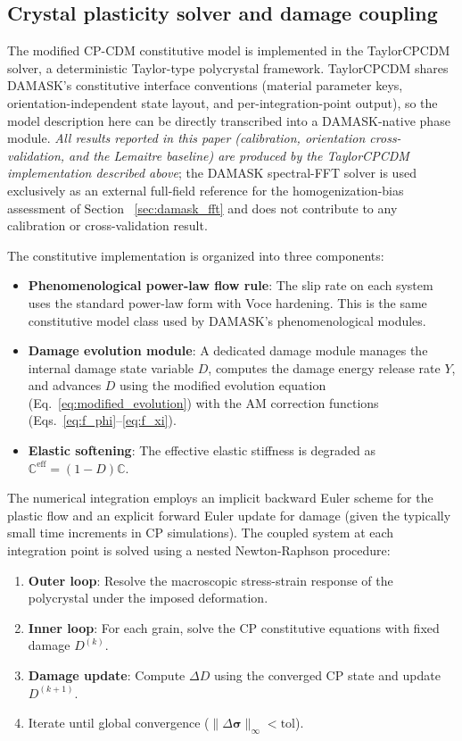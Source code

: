 \subsection{Crystal plasticity solver and damage coupling}

The modified CP-CDM constitutive model is implemented in the TaylorCPCDM solver, a deterministic Taylor-type polycrystal framework. TaylorCPCDM shares DAMASK's constitutive interface conventions (material parameter keys, orientation-independent state layout, and per-integration-point output), so the model description here can be directly transcribed into a DAMASK-native phase module. \emph{All results reported in this paper (calibration, orientation cross-validation, and the Lemaitre baseline) are produced by the TaylorCPCDM implementation described above}; the DAMASK spectral-FFT solver is used exclusively as an external full-field reference for the homogenization-bias assessment of Section~
\ref{sec:damask_fft} and does not contribute to any calibration or cross-validation result.

The constitutive implementation is organized into three components:

\begin{itemize}
    \item \textbf{Phenomenological power-law flow rule}: The slip rate on each system uses the standard power-law form with Voce hardening. This is the same constitutive model class used by DAMASK's phenomenological modules.

    \item \textbf{Damage evolution module}: A dedicated damage module manages the internal damage state variable $D$, computes the damage energy release rate $Y$, and advances $D$ using the modified evolution equation (Eq.~\ref{eq:modified_evolution}) with the AM correction functions (Eqs.~\ref{eq:f_phi}--\ref{eq:f_xi}).

    \item \textbf{Elastic softening}: The effective elastic stiffness is degraded as $\mathbb{C}^{\text{eff}} = (1-D)\mathbb{C}$.
\end{itemize}

The numerical integration employs an implicit backward Euler scheme for the plastic flow and an explicit forward Euler update for damage (given the typically small time increments in CP simulations). The coupled system at each integration point is solved using a nested Newton-Raphson procedure:

\begin{enumerate}\def\labelenumi{(\arabic{enumi})}
    \item \textbf{Outer loop}: Resolve the macroscopic stress-strain response of the polycrystal under the imposed deformation.
    \item \textbf{Inner loop}: For each grain, solve the CP constitutive equations with fixed damage $D^{(k)}$.
    \item \textbf{Damage update}: Compute $\Delta D$ using the converged CP state and update $D^{(k+1)}$.
    \item Iterate until global convergence ($\|\Delta\boldsymbol{\sigma}\|_\infty < \text{tol}$).
\end{enumerate}

